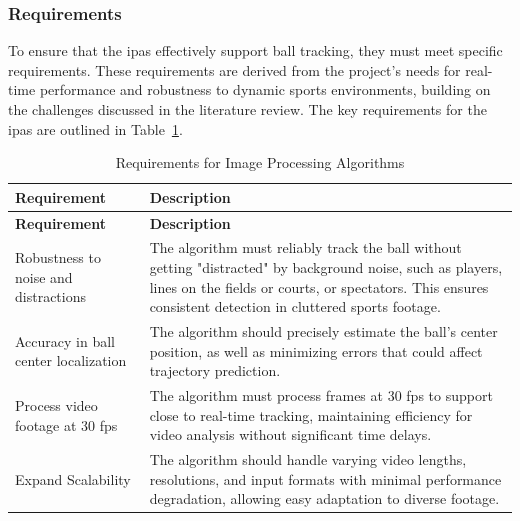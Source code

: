 \documentclass[12pt,a4paper]{article}
\begin{document}
\subsubsection{Requirements}
To ensure that the \acs{ipa}s effectively support ball tracking, they must meet specific requirements. These requirements are derived from the project's needs for real-time performance and robustness to dynamic sports environments, building on the challenges discussed in the literature review. The key requirements for the \acs{ipa}s are outlined in Table~\ref{tab:ipa_requirements}. 

\begin{longtable}{@{} p{} p{} @{}}
    \caption{Requirements for Image Processing Algorithms}
    \label{tab:ipa_requirements} \\
        \toprule
        \textbf{Requirement} & \textbf{Description} \\
        \midrule
        \endfirsthead
        \toprule
        \textbf{Requirement} & \textbf{Description} \\
        \midrule
        \endhead
        \bottomrule
        \endfoot
        \bottomrule
        \endlastfoot
        Robustness to noise and distractions & The algorithm must reliably track the ball without getting "distracted" by background noise, such as players, lines on the fields or courts, or spectators. This ensures consistent detection in cluttered sports footage. \\
        
        Accuracy in ball center localization & The algorithm should precisely estimate the ball's center position, as well as minimizing errors that could affect trajectory prediction. \\
        
        Process video footage at 30 \acs{fps} & The algorithm must process frames at 30 \acs{fps} to support close to real-time tracking, maintaining efficiency for video analysis without significant time delays. \\
        
        Expand Scalability & The algorithm should handle varying video lengths, resolutions, and input formats with minimal performance degradation, allowing easy adaptation to diverse footage. \\
\end{longtable}
\end{document}
